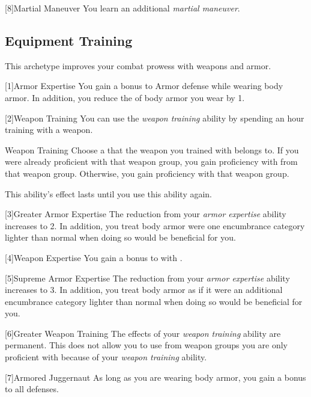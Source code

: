         [8]{Martial Maneuver}
        You learn an additional \textit{martial maneuver}.

    \subsection{Equipment Training}
        This archetype improves your combat prowess with weapons and armor.

        [1]{Armor Expertise}
        You gain a  bonus to Armor defense while wearing body armor.
        In addition, you reduce the  of body armor you wear by 1.

        [2]{Weapon Training} You can use the \textit{weapon training} ability by spending an hour training with a weapon.
        \begin{freeability}{Weapon Training}
            Choose a  that the weapon you trained with belongs to.
            If you were already proficient with that weapon group, you gain proficiency with  from that weapon group.
            Otherwise, you gain proficiency with that weapon group.

            This ability's effect lasts until you use this ability again.
        \end{freeability}

        [3]{Greater Armor Expertise}
        The  reduction from your \textit{armor expertise} ability increases to 2.
        In addition, you treat body armor were one encumbrance category lighter than normal when doing so would be beneficial for you.

        [4]{Weapon Expertise} You gain a  bonus to  with .

        [5]{Supreme Armor Expertise}
        The  reduction from your \textit{armor expertise} ability increases to 3.
        In addition, you treat body armor as if it were an additional encumbrance category lighter than normal when doing so would be beneficial for you.

        [6]{Greater Weapon Training} The effects of your \textit{weapon training} ability are permanent.
        This does not allow you to use  from weapon groups you are only proficient with because of your \textit{weapon training} ability.

        [7]{Armored Juggernaut}
        As long as you are wearing body armor, you gain a  bonus to all defenses.

